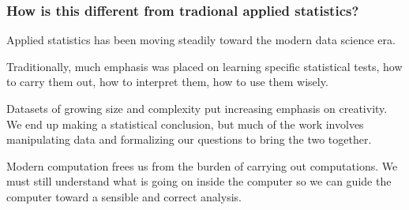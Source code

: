 \documentclass{beamer}
\begin{document}
\begin{frame}
\frametitle{How is this different from tradional applied statistics?}

\begin{myitemize}
\item Applied statistics has been moving steadily toward the modern data science era.

\item Traditionally, much emphasis was placed on learning specific statistical tests, how to carry them out, how to interpret them, how to use them wisely.

\item Datasets of growing size and complexity put increasing emphasis on creativity. We end up making a statistical conclusion, but much of the work involves manipulating data and formalizing our questions to bring the two together.

\item Modern computation frees us from the burden of carrying out computations. We must still understand what is going on inside the computer so we can guide the computer toward a sensible and correct analysis.

\end{myitemize}

\end{frame}

\end{document}
